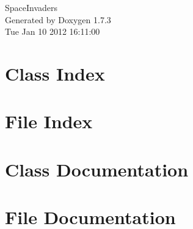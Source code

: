\documentclass[a4paper]{book}
\begin{document}
\hypersetup{pageanchor=false}
\begin{titlepage}
\vspace*{7cm}
\begin{center}
{\Large SpaceInvaders }\\
\vspace*{1cm}
{\large Generated by Doxygen 1.7.3}\\
\vspace*{0.5cm}
{\small Tue Jan 10 2012 16:11:00}\\
\end{center}
\end{titlepage}
\clearemptydoublepage
{}
\tableofcontents
\clearemptydoublepage
{}
\hypersetup{pageanchor=true}
\chapter{Class Index}

\chapter{File Index}

\chapter{Class Documentation}

\chapter{File Documentation}

















\printindex
\end{document}
